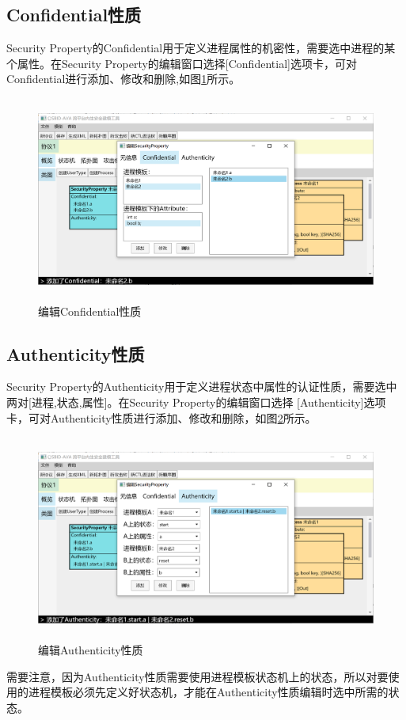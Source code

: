 \subsection{Confidential性质}
Security Property的Confidential用于定义进程属性的机密性，需要选中进程的某个属性。在Security Property的编辑窗口选择[Confidential]选项卡，可对Confidential进行添加、修改和删除,如图\ref{security_edit_confidential}所示。
\begin{figure}[h]
	\centering
	\includegraphics[width=12cm,height=6.75cm]{imgs/security_edit_confidential.png}
	\caption{编辑Confidential性质}
	\label{security_edit_confidential}
\end{figure}
\subsection{Authenticity性质}
Security Property的Authenticity用于定义进程状态中属性的认证性质，需要选中两对[进程,状态,属性]。在Security Property的编辑窗口选择 [Authenticity]选项卡，可对Authenticity性质进行添加、修改和删除，如图\ref{security_edit_authenticity}所示。
\begin{figure}[h]
	\centering
	\includegraphics[width=12cm,height=6.75cm]{imgs/security_edit_authenticity.png}
	\caption{编辑Authenticity性质}
	\label{security_edit_authenticity}
\end{figure}
\par
需要注意，因为Authenticity性质需要使用进程模板状态机上的状态，所以对要使用的进程模板必须先定义好状态机，才能在Authenticity性质编辑时选中所需的状态。